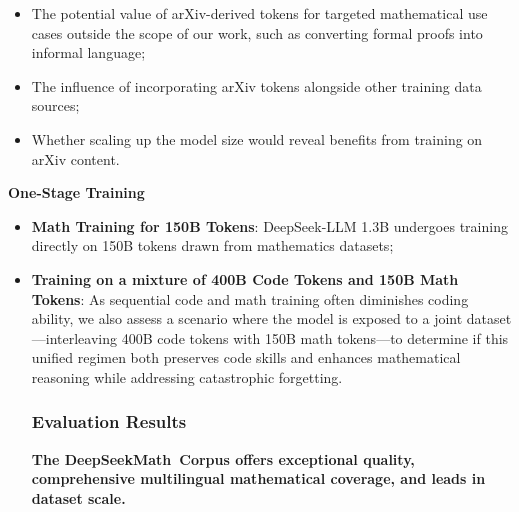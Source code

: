 \begin{itemize}[topsep=0pt]
\begin{itemize}[topsep=0pt]
    \item The potential value of arXiv-derived tokens for targeted mathematical use cases outside the scope of our work, such as converting formal proofs into informal language;
    \item The influence of incorporating arXiv tokens alongside other training data sources;
    \item Whether scaling up the model size would reveal benefits from training on arXiv content. \end{itemize}

\textbf{One-Stage Training}

\begin{itemize}[topsep=0pt]
    \item \textbf{Math Training for 150B Tokens}: DeepSeek-LLM 1.3B undergoes training directly on 150B tokens drawn from mathematics datasets;
    \item \textbf{Training on a mixture of 400B Code Tokens and 150B Math Tokens}: As sequential code and math training often diminishes coding ability, we also assess a scenario where the model is exposed to a joint dataset—interleaving 400B code tokens with 150B math tokens—to determine if this unified regimen both preserves code skills and enhances mathematical reasoning while addressing catastrophic forgetting. \subsubsection{Evaluation Results}

\textbf{The DeepSeekMath~Corpus offers exceptional quality, comprehensive multilingual mathematical coverage, and leads in dataset scale.}


\end{itemize}
\end{itemize}
